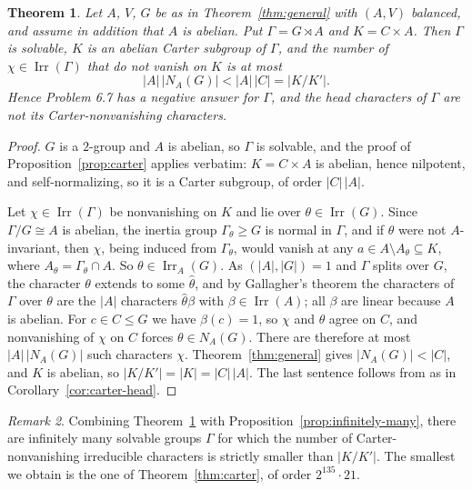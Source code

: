 \documentclass[11pt]{article}
\newtheorem{theorem}{Theorem}[section]
\theoremstyle{definition}
\theoremstyle{remark}
\newtheorem{remark}[theorem]{Remark}
\newcommand{\Irr}{\operatorname{Irr}}
\begin{document}
\begin{theorem}\label{thm:carter-general}
Let $A$, $V$, $G$ be as in Theorem~\ref{thm:general} with $(A,V)$
balanced, and assume in addition that $A$ is abelian.  Put
$\Gamma=G\rtimes A$ and $K=C\times A$.  Then $\Gamma$ is solvable, $K$
is an abelian Carter subgroup of $\Gamma$, and the number of
$\chi\in\Irr(\Gamma)$ that do not vanish on $K$ is at most
\[
 |A|\,|N_A(G)|<|A|\,|C|=|K/K'| .
\]
Hence Problem 6.7 has a negative answer for $\Gamma$, and the head
characters of $\Gamma$ are not its Carter-nonvanishing characters.
\end{theorem}

\begin{proof}
$G$ is a $2$-group and $A$ is abelian, so $\Gamma$ is solvable, and the
proof of Proposition~\ref{prop:carter} applies verbatim: $K=C\times A$
is abelian, hence nilpotent, and self-normalizing, so it is a Carter
subgroup, of order $|C|\,|A|$.

Let $\chi\in\Irr(\Gamma)$ be nonvanishing on $K$ and lie over
$\theta\in\Irr(G)$.  Since $\Gamma/G\cong A$ is abelian, the inertia
group $\Gamma_\theta\ge G$ is normal in $\Gamma$, and if $\theta$ were
not $A$-invariant, then $\chi$, being induced from $\Gamma_\theta$,
would vanish at any $a\in A\setminus A_\theta\subseteq K$, where
$A_\theta=\Gamma_\theta\cap A$.  So $\theta\in\Irr_A(G)$.  As
$(|A|,|G|)=1$ and $\Gamma$ splits over $G$, the character $\theta$
extends to some $\hat\theta$, and by Gallagher's theorem the characters
of $\Gamma$ over $\theta$ are the $|A|$ characters $\hat\theta\beta$
with $\beta\in\Irr(A)$; all $\beta$ are linear because $A$ is abelian.
For $c\in C\le G$ we have $\beta(c)=1$, so $\chi$ and $\theta$ agree on
$C$, and nonvanishing of $\chi$ on $C$ forces $\theta\in N_A(G)$.
There are therefore at most $|A|\,|N_A(G)|$ such characters
$\chi$.  Theorem~\ref{thm:general} gives $|N_A(G)|<|C|$, and $K$ is
abelian, so $|K/K'|=|K|=|C|\,|A|$.  The last sentence follows from
\cite[Theorem A]{isaacs-carter} as in Corollary~\ref{cor:carter-head}.
\end{proof}

\begin{remark}
Combining Theorem~\ref{thm:carter-general} with
Proposition~\ref{prop:infinitely-many}, there are infinitely many
solvable groups $\Gamma$ for which the number of Carter-nonvanishing
irreducible characters is strictly smaller than $|K/K'|$.  The smallest
we obtain is the one of Theorem~\ref{thm:carter}, of order
$2^{135}\cdot21$.
\end{remark}
\end{document}
